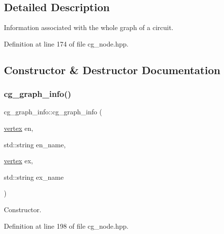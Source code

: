 \subsection{Detailed Description}
Information associated with the whole graph of a circuit. 

Definition at line 174 of file cg\+\_\+node.\+hpp.



\subsection{Constructor \& Destructor Documentation}
\mbox{\label{structcg__graph__info_a2e148afc2a1a8899406eb1b779f14480}} 
\subsubsection{\texorpdfstring{cg\+\_\+graph\+\_\+info()}{cg\_graph\_info()}\hspace{0.1cm}{\footnotesize\ttfamily [1/2]}}
{\footnotesize\ttfamily cg\+\_\+graph\+\_\+info\+::cg\+\_\+graph\+\_\+info (\begin{DoxyParamCaption}\item[{\hyperlink{graph_8hpp_abefdcf0544e601805af44eca032cca14}{vertex}}]{en,  }\item[{std\+::string}]{en\+\_\+name,  }\item[{\hyperlink{graph_8hpp_abefdcf0544e601805af44eca032cca14}{vertex}}]{ex,  }\item[{std\+::string}]{ex\+\_\+name }\end{DoxyParamCaption})\hspace{0.3cm}{\ttfamily [inline]}}



Constructor. 



Definition at line 198 of file cg\+\_\+node.\+hpp.

\mbox{\label{structcg__graph__info_aa04d1815bea5e28c195b0efc0b0d3c02}} 
